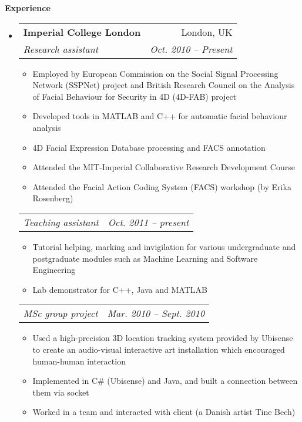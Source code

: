 \documentclass[letterpaper,11pt]{article}
\makeatletter
\newcommand{\resitem}[1]{\item #1 \vspace{-2pt}}
\newcommand{\resheading}[1]{{\large \colorbox{mygrey}{\begin{minipage}{\textwidth}{\textbf{#1 \vphantom{p\^{E}}}}\end{minipage}}}}
\newcommand{\ressubheading}[4]{
\begin{tabular*}{6.5in}{l@{\extracolsep{\fill}}r}
		\textbf{#1} & #2 \\
		\textit{#3} & \textit{#4} \\
\end{tabular*}\vspace{-6pt}}
\newcommand{\ressubsubheading}[2]{
\begin{tabular*}{6.5in}{l@{\extracolsep{\fill}}r}
		\textit{#1} & \textit{#2} \\
\end{tabular*}\vspace{-6pt}}
\makeatother
\begin{document}
\resheading{Experience}
	\begin{itemize}
		\item 
			\ressubheading{{Imperial College London}}{London, UK}
				{Research assistant}{Oct. 2010 -- Present}
				{ \small
				\begin{itemize}
				
					\resitem{Employed by European Commission on the Social Signal Processing Network (SSPNet) project and British Research Council on the Analysis of Facial Behaviour for Security in 4D (4D-FAB) project}
					\resitem{Developed tools in MATLAB and C++ for automatic facial behaviour analysis}
					\resitem{4D Facial Expression Database processing and FACS annotation}

					\resitem{Attended the MIT-Imperial Collaborative Research Development Course}
					\resitem{Attended the Facial Action Coding System (FACS) workshop (by Erika Rosenberg)}
				\end{itemize}
				}

			\ressubsubheading{Teaching assistant}{Oct. 2011 -- present}
				{ \small
				\begin{itemize}
					\resitem{Tutorial helping, marking and invigilation for various undergraduate and postgraduate modules such as Machine Learning and Software Engineering}
					\resitem{Lab demonstrator for C++, Java and MATLAB}
				\end{itemize}
				}

			\ressubsubheading{MSc group project}{Mar. 2010 -- Sept. 2010}
				{ \small
				\begin{itemize}
					\resitem{Used a high-precision 3D location tracking system provided by Ubisense to create an audio-visual interactive art installation which encouraged human-human interaction}
					\resitem{Implemented in C\# (Ubisense) and Java, and built a connection between them via socket}
					\resitem{Worked in a team and interacted with client (a Danish artist Tine Bech)}
				\end{itemize}
				}


\end{itemize}
\end{document}
